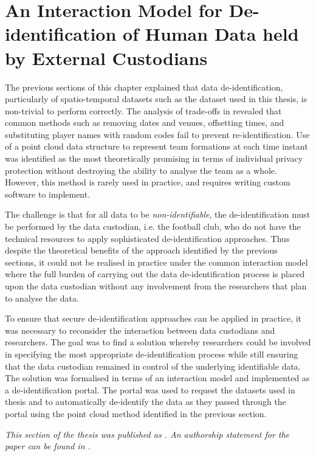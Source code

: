 \pagebreak

\section{An Interaction Model for De-identification of Human Data held by External Custodians} \label{sec:Simmons2018}

The previous sections of this chapter explained that data de-identification, particularly of spatio-temporal datasets such as the \afl{} dataset used in this thesis, is non-trivial to perform correctly. The analysis of trade-offs in  revealed that common methods such as removing dates and venues, offsetting times, and substituting player names with random codes fail to prevent re-identification. Use of a point cloud data structure to represent team formations at each time instant was identified as the most theoretically promising in terms of individual privacy protection without destroying the ability to analyse the team as a whole. However, this method is rarely used in practice, and requires writing custom software to implement.

The challenge is that for all data to be \textit{non-identifiable}, the de-identification must be performed by the data custodian, i.e. the football club, who do not have the technical resources to apply sophisticated de-identification approaches. Thus despite the theoretical benefits of the approach identified by the previous sections, it could not be realised in practice under the common interaction model where the full burden of carrying out the data de-identification process is placed upon the data custodian without any involvement from the researchers that plan to analyse the data.

To ensure that secure de-identification approaches can be applied in practice, it was necessary to reconsider the interaction between data custodians and researchers. The goal was to find a solution whereby researchers could be involved in specifying the most appropriate de-identification process while still ensuring that the data custodian remained in control of the underlying identifiable data. The solution was formalised in terms of an interaction model and implemented as a de-identification portal. The portal was used to request the \afl{} datasets used in thesis and to automatically de-identify the data as they passed through the portal using the point cloud method identified in the previous section.

\textit{This section of the thesis was published as . An authorship statement for the paper can be found in .}


